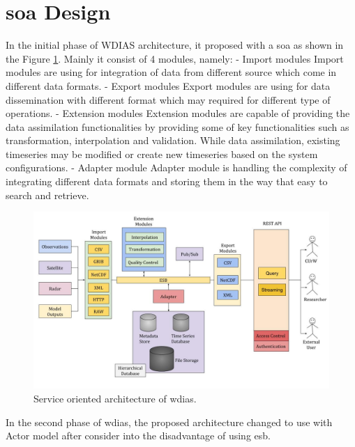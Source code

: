 \section{\acrfull{soa} Design}

In the initial phase of WDIAS architecture, it proposed with a \acrfull{soa} as shown in the Figure \ref{fi:proposed_soa_arch_design}. Mainly it consist of 4 modules, namely:
- Import modules
Import modules are using for integration of data from different source which come in different data formats.
- Export modules
Export modules are using for data dissemination with different format which may required for different type of operations.
- Extension modules
Extension modules are capable of providing the data assimilation functionalities by providing some of key functionalities such as transformation, interpolation and validation. While data assimilation, existing timeseries may be modified or create new timeseries based on the system configurations.
- Adapter module
Adapter module is handling the complexity of integrating different data formats and storing them in the way that easy to search and retrieve.

\begin{figure}[htp]
    \centering
    \includegraphics[width=1\textwidth]{method/soa/soa_v1.jpg}
    \caption{Service oriented architecture of \acrshort{wdias}.}
    \label{fi:proposed_soa_arch_design}
\end{figure}

In the second phase of \acrshort{wdias}, the proposed architecture changed to use with Actor model after consider into the disadvantage of using \acrshort{esb}.
